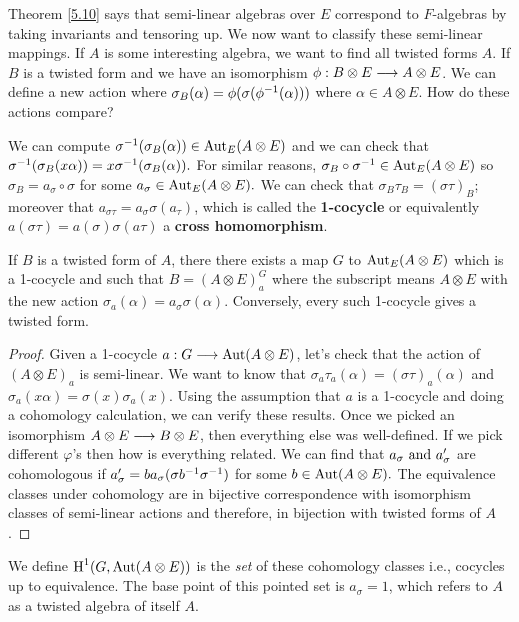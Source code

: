 Theorem \ref{5.10} says that semi-linear algebras over $E$ correspond to $F$-algebras by taking invariants and tensoring up. We now want to classify these semi-linear mappings. If $A$ is some interesting algebra, we want to find all twisted forms $A$. If $B$ is a twisted form and we have an isomorphism $\phi : B \otimes E \longrightarrow A \otimes E$. We can define a new action where $\sigma_B(\alpha) = \phi(\sigma(\phi^{-1}(\alpha)))$ where $\alpha \in A \otimes E$. How do these actions compare?

We can compute $\sigma^{-1}(\sigma_B(\alpha)) \in \operatorname{Aut}_E(A\otimes E)$ and we can check that $\sigma^{-1}(\sigma_B(x\alpha)) = x \sigma^{-1}(\sigma_B(\alpha)).$ For similar reasons, $\sigma_B \circ \sigma^{-1} \in \operatorname{Aut}_E(A\otimes E)$ so $\sigma_B = a_{\sigma}\circ \sigma$ for some $a_{\sigma}\in \operatorname{Aut}_E(A\otimes E).$ We can check that $\sigma_B\tau_B = (\sigma\tau)_B$; moreover that $a_{\sigma\tau} = a_{\sigma}\sigma(a_{\tau})$, which is called the \textbf{1-cocycle} or equivalently $a(\sigma \tau)  =a(\sigma)\sigma(a\tau)$ a \textbf{cross homomorphism}.


\begin{theorem}\label{5.13}
If $B$ is a twisted form of $A$, there there exists a map $G$ to $\operatorname{Aut}_E(A\otimes E)$ which is a 1-cocycle and such that $B = (A \otimes E)_a^G$ where the subscript means $A\otimes E$ with the new action $\sigma_a(\alpha) = a_{\sigma}\sigma(\alpha)$. Conversely, every such 1-cocycle gives a twisted form.
\end{theorem}


\begin{proof}
Given a 1-cocycle $a : G \longrightarrow \operatorname{Aut}(A\otimes E)$, let's check that the action of $(A\otimes E)_a$ is semi-linear. We want to know that $\sigma_a\tau_a(\alpha) = (\sigma\tau)_a(\alpha)$ and $\sigma_a(x\alpha) = \sigma(x)\sigma_a(x)$. Using the assumption that $a$ is a 1-cocycle and doing a cohomology calculation, we can verify these results. Once we picked an isomorphism $A\otimes E \longrightarrow B \otimes E$, then everything else was well-defined. If we pick different $\varphi$'s then how is everything related. We can find that $a_{\sigma}\text{ and } a_{\sigma}'$ are cohomologous if $a_{\sigma}' = ba_{\sigma}(\sigma b^{-1} \sigma^{-1})$ for some $b \in \operatorname{Aut} (A\otimes E).$ The equivalence classes under cohomology are in bijective correspondence with isomorphism classes of semi-linear actions and therefore, in bijection with twisted forms of $A$.

\end{proof}
\begin{defn}\label{5.14}
We define $\text{H}^1(G,\operatorname{Aut} (A\otimes E))$ is the \textit{set} of these cohomology classes i.e., cocycles up to equivalence. The base point of this pointed set is $a_{\sigma} = 1$, which refers to $A$ as a twisted algebra of itself $A$.
\end{defn}





